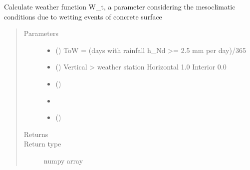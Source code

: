 \documentclass[letterpaper,10pt,english]{sphinxmanual}
\begin{document}
\begin{fulllineitems}
\label{\detokenize{carbonation:carbonation.W_t}}
\sphinxAtStartPar
Calculate weather function W\_t, a parameter considering the meso\sphinxhyphen{}climatic conditions due to wetting events of concrete surface
\begin{quote}\begin{description}
\item[{Parameters}] \leavevmode\begin{itemize}
\item {} 
\sphinxAtStartPar
{} (\sphinxstyleliteralemphasis{\sphinxupquote{ {[}}}\sphinxstyleliteralemphasis{\sphinxupquote{\sphinxhyphen{}}}\sphinxstyleliteralemphasis{\sphinxupquote{{]}}}) \textendash{} ToW = (days with rainfall h\_Nd \textgreater{}= 2.5 mm per day)/365

\item {} 
\sphinxAtStartPar
{} (\sphinxstyleliteralemphasis{\sphinxupquote{ {[}}}\sphinxstyleliteralemphasis{\sphinxupquote{\sphinxhyphen{}}}\sphinxstyleliteralemphasis{\sphinxupquote{{]}}}) \textendash{} Vertical \sphinxhyphen{}\textgreater{} weather station
Horizontal 1.0
Interior 0.0

\item {} 
\sphinxAtStartPar
{}\sphinxstyleliteralstrong{\sphinxupquote{ {[}}}\sphinxstyleliteralstrong{\sphinxupquote{\sphinxhyphen{}}}\sphinxstyleliteralstrong{\sphinxupquote{{]} }}\sphinxstyleliteralstrong{\sphinxupquote{(}} () \textendash{} 

\item {} 
\sphinxAtStartPar
{}\sphinxstyleliteralstrong{\sphinxupquote{)}} \textendash{} 

\item {} 
\sphinxAtStartPar
{} () \textendash{} 

\end{itemize}

\item[{Returns}] \leavevmode
\sphinxAtStartPar
{}

\item[{Return type}] \leavevmode
\sphinxAtStartPar
numpy array

\end{description}\end{quote}

\end{fulllineitems}
\end{document}
